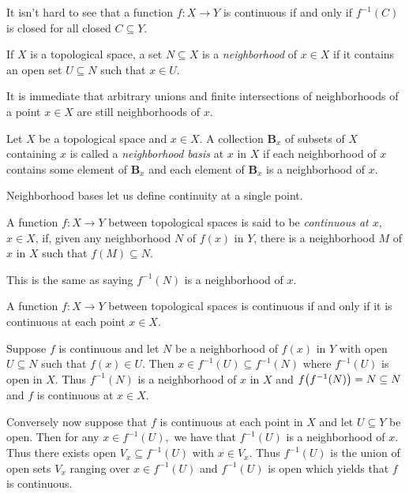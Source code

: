 \documentclass[letterpaper, 11pt]{article}
\begin{document}
It isn't hard to see that a function $f\colon X \to Y$ is continuous if and only if $f^{-1}(C)$ is closed for all closed $C \subseteq Y$.

\begin{defn}[Neighborhood]
  If $X$ is a topological space, a set $N \subseteq X$ is a \emph{neighborhood} of $x \in X$ if it contains an open set $U \subseteq N$ such that $x \in U$.
\end{defn}

It is immediate that arbitrary unions and finite intersections of neighborhoods of a point $x \in X$ are still neighborhoods of $x$.

\begin{defn}
  Let $X$ be a topological space and $x \in X$.
  A collection $\textbf{B}_{x}$ of subsets of $X$ containing $x$ is called a \emph{neighborhood basis} at $x$ in $X$ if each neighborhood of $x$ contains some element of $\textbf{B}_{x}$ and each element of $\textbf{B}_{x}$ is a neighborhood of $x$.
\end{defn}

Neighborhood bases let us define continuity at a single point.

\begin{defn}
  A function $f\colon X \to Y$ between topological spaces is said to be \emph{continuous at $x$}, $x \in X$, if, given any neighborhood $N$ of $f(x)$ in $Y$, there is a neighborhood $M$ of $x$ in $X$ such that $f(M) \subseteq N$.
\end{defn}

This is the same as saying $f^{-1}(N)$ is a neighborhood of $x$.

\clearpage

\begin{prop}
  A function $f\colon X \to Y$ between topological spaces is continuous if and only if it is continuous at each point $x \in X$.
\end{prop}
\begin{pf}
  Suppose $f$ is continuous and let $N$ be a neighborhood of $f(x)$ in $Y$ with open $U \subseteq N$ such that $f(x) \in U$.
  Then $x \in f^{-1}(U) \subseteq f^{-1}(N)$ where $f^{-1}(U)$ is open in $X$.
  Thus $f^{-1}(N)$ is a neighborhood of $x$ in $X$ and $f\pqty{f^{-1}(N)} = N \subseteq N$ and $f$ is continuous at $x \in X$.

  Conversely now suppose that $f$ is continuous at each point in $X$ and let $U \subseteq Y$ be open.
  Then for any $x \in f^{-1}(U),$ we have that $f^{-1}(U)$ is a neighborhood of $x$.
  Thus there exists open $V_{x} \subseteq f^{-1}(U)$ with $x \in V_{x}$.
  Thus $f^{-1}(U)$ is the union of open sets $V_{x}$ ranging over $x \in f^{-1}(U)$ and $f^{-1}(U)$ is open which yields that $f$ is continuous.
\end{pf}
\end{document}

